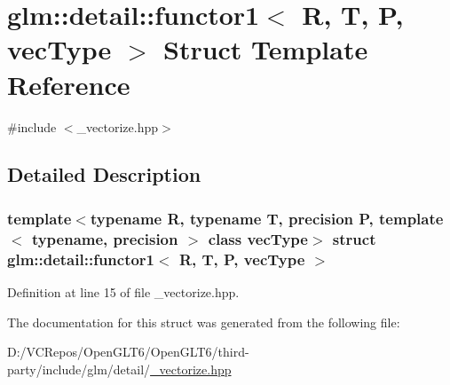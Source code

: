 \hypertarget{structglm_1_1detail_1_1functor1}{}\section{glm\+::detail\+::functor1$<$ R, T, P, vec\+Type $>$ Struct Template Reference}
\label{structglm_1_1detail_1_1functor1}


{\ttfamily \#include $<$\+\_\+vectorize.\+hpp$>$}



\subsection{Detailed Description}
\subsubsection*{template$<$typename R, typename T, precision P, template$<$ typename, precision $>$ class vec\+Type$>$\newline
struct glm\+::detail\+::functor1$<$ R, T, P, vec\+Type $>$}



Definition at line 15 of file \+\_\+vectorize.\+hpp.



The documentation for this struct was generated from the following file\+:\begin{DoxyCompactItemize}
\item 
D\+:/\+V\+C\+Repos/\+Open\+G\+L\+T6/\+Open\+G\+L\+T6/third-\/party/include/glm/detail/\mbox{\hyperlink{__vectorize_8hpp}{\+\_\+vectorize.\+hpp}}\end{DoxyCompactItemize}
